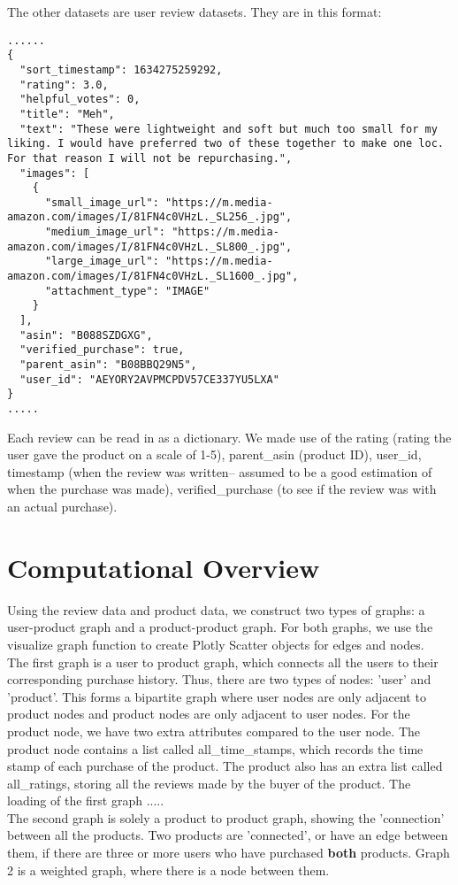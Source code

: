 \documentclass[fontsize=11pt]{article}
\begin{document}
\vspace{\baselineskip}
The other datasets are user review datasets. They are in this format:
\begin{verbatim}
......
{
  "sort_timestamp": 1634275259292,
  "rating": 3.0,
  "helpful_votes": 0,
  "title": "Meh",
  "text": "These were lightweight and soft but much too small for my liking. I would have preferred two of these together to make one loc. For that reason I will not be repurchasing.",
  "images": [
    {
      "small_image_url": "https://m.media-amazon.com/images/I/81FN4c0VHzL._SL256_.jpg",
      "medium_image_url": "https://m.media-amazon.com/images/I/81FN4c0VHzL._SL800_.jpg",
      "large_image_url": "https://m.media-amazon.com/images/I/81FN4c0VHzL._SL1600_.jpg",
      "attachment_type": "IMAGE"
    }
  ],
  "asin": "B088SZDGXG",
  "verified_purchase": true,
  "parent_asin": "B08BBQ29N5",
  "user_id": "AEYORY2AVPMCPDV57CE337YU5LXA"
}
.....
\end{verbatim}
Each review can be read in as a dictionary. We made use of the rating (rating the user gave the product on a scale of 1-5), parent\_asin (product ID), user\_id, timestamp (when the review was written-- assumed to be a good estimation of when the purchase was made), verified\_purchase (to see if the review was with an actual purchase).

\section*{Computational Overview}
Using the review data and product data, we construct two types of graphs: a user-product graph and a product-product graph. For both graphs, we use the visualize graph function to create Plotly Scatter objects for edges and nodes. \\
The first graph is a user to product graph, which connects all the users to their corresponding purchase history. Thus, there are two types of nodes: 'user' and 'product'. This forms a bipartite graph where user nodes are only adjacent to product nodes and product nodes are only adjacent to user nodes. For the product node, we have two extra attributes compared to the user node. The product node contains a list called all\_time\_stamps, which records the time stamp of each purchase of the product. The product also has an extra list called all\_ratings, storing all the reviews made by the buyer of the product. The loading of the first graph .....\\

The second graph is solely a product to product graph, showing the 'connection' between all the products. Two products are 'connected', or have an edge between them, if there are three or more users who have purchased \textbf{both} products. Graph 2 is a weighted graph, where there is a node between them.
\end{document}
